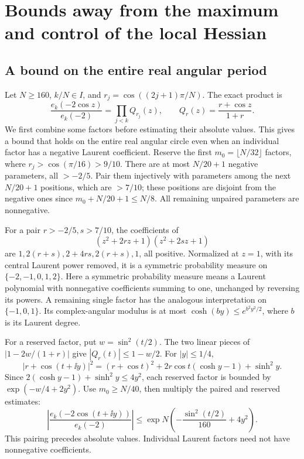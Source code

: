 \section{Bounds away from the maximum and control of the local Hessian}\label{cta:angular}

\subsection{A bound on the entire real angular period}
Let \(N\ge160\), \(k/N\in I\), and
\(r_j=\cos((2j+1)\pi/N)\). The exact product is
\[
 \frac{e_k(-2\cos z)}{e_k(-2)}
   =\prod_{j<k}Q_{r_j}(z),\qquad
 Q_r(z)=\frac{r+\cos z}{1+r}.
\]
We first combine some factors before estimating their absolute
values. This gives a bound that holds on the entire real angular
circle even when an individual factor has a negative Laurent
coefficient. Reserve the first \(m_0=\lfloor N/32\rfloor\) factors, where
\(r_j>\cos(\pi/16)>9/10\).
There are at most \(N/20+1\) negative parameters, all \(>-2/5\).
Pair them injectively with parameters among the next
\(N/20+1\) positions, which are \(>7/10\); these positions
are disjoint from the negative ones since \(m_0+N/20+1\le N/8\).
All remaining unpaired parameters are nonnegative.

For a pair \(r>-2/5,s>7/10\), the coefficients of
\[
 (z^2+2rz+1)(z^2+2sz+1)
\]
are \(1,2(r+s),2+4rs,2(r+s),1\), all positive.
Normalized at \(z=1\), with its central Laurent power removed,
it is a symmetric probability measure on
\(\{-2,-1,0,1,2\}\).
Here a symmetric probability measure means a Laurent polynomial
with nonnegative coefficients summing to one, unchanged by reversing
its powers. A remaining single factor has the analogous interpretation
on \(\{-1,0,1\}\). Its complex-angular modulus is at most
\(\cosh(by)\le e^{b^2y^2/2}\), where \(b\) is its Laurent degree.

For a reserved factor, put \(w=\sin^2(t/2)\). The two linear
pieces of \(|1-2w/(1+r)|\) give
\(|Q_r(t)|\le1-w/2\). For \(|y|\le1/4\),
\[
 |r+\cos(t+\ii y)|^2
 =(r+\cos t)^2+2r\cos t(\cosh y-1)+\sinh^2 y .
\]
Since \(2(\cosh y-1)+\sinh^2y\le4y^2\), each reserved
factor is bounded by \(\exp(-w/4+2y^2)\).
Use \(m_0\ge N/40\), then multiply the paired and reserved
estimates:
\begin{equation}\label{cta:raw}
 \left|\frac{e_k(-2\cos(t+\ii y))}{e_k(-2)}\right|
 \le\exp N\left(-\frac{\sin^2(t/2)}{160}+4y^2\right).
\end{equation}
This pairing precedes absolute values. Individual Laurent
factors need not have nonnegative coefficients.

